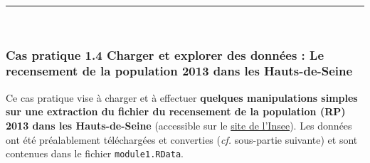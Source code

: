\documentclass[12pt,twosided, notitlepage]{book}
\begin{document}
\begin{center}\rule{0.5\linewidth}{\linethickness}\end{center}

~

\subsubsection{\texorpdfstring{\textbf{Cas pratique 1.4} Charger et
explorer des données : Le recensement de la population 2013 dans les
Hauts-de-Seine}{Cas pratique 1.4 Charger et explorer des données : Le recensement de la population 2013 dans les Hauts-de-Seine}}\label{cas-pratique-1.4-charger-et-explorer-des-donnees-le-recensement-de-la-population-2013-dans-les-hauts-de-seine}

Ce cas pratique vise à charger et à effectuer \textbf{quelques
manipulations simples sur une extraction du fichier du recensement de la
population (RP) 2013 dans les Hauts-de-Seine} (accessible sur le
\href{https://www.insee.fr/fr/statistiques/2409491}{site de l'Insee}).
Les données ont été préalablement téléchargées et converties (\emph{cf.}
sous-partie suivante) et sont contenues dans le fichier
\texttt{module1.RData}.
\end{document}
